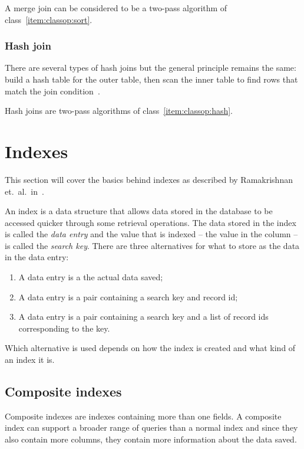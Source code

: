 A merge join can be considered to be a two-pass algorithm of class~\ref{item:classop:sort}.

\subsubsection{Hash join}
There are several types of hash joins but the general principle remains the
same: build a hash table for the outer table, then scan the inner table to find
rows that match the join condition~\cite[p. 732-738]{garcia-molina_2002_database_dstcb}.

Hash joins are two-pass algorithms of class~\ref{item:classop:hash}.

\section{Indexes}
This section will cover the basics behind indexes as described by Ramakrishnan
et.\ al.\ in~\cite[Ch. 8]{ramakrishnan_2003_database_dms}.

An index is a data structure that allows data stored in the database to be accessed quicker through some retrieval operations. The data stored in the index is called the \textit{data entry} and the value that is indexed – the value in the column – is called the \textit{search key}. There are three alternatives for what to store as the data in the data entry:

\begin{enumerate}
    \item\label{item:indexes:alt1} A data entry is a the actual data saved;
    \item\label{item:indexes:alt2} A data entry is a pair containing a search key and record id;
    \item\label{item:indexes:alt3} A data entry is a pair containing a search key and a list of record ids corresponding to the key.
\end{enumerate}

Which alternative is used depends on how the index is created and what kind of an index it is.

\subsection{Composite indexes}
Composite indexes are indexes containing more than one fields. A composite index can support a broader range of queries than a normal index and since they also contain more columns, they contain more information about the data saved.

